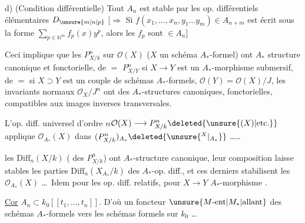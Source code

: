 d) (Condition différentielle) Tout $A_n$ est stable par les op. différentiels élémentaires $D_{\unsure{m|n|p}}$ [$\Longrightarrow$ Si $f(x_1,\ldots,x_n,y_1\ldots y_m)\in A_{n+m}$ est écrit sous la forme $\sum_{p\in\mathbb N^m}f_p(x)y^p$, alors les $f_p$ sont $\in A_n$]


Ceci implique que les  $P^n_{X/k}$ sur $\mathcal O(X)$ ($X$ un  schéma $A_*$-formel) ont  $A_*$ structure canonique et fonctorielle, de $=$ $P^n_{X/Y}$ si $X\to Y$ est un $A_*$-morphisme submersif, de $=$  si $X\supset Y$ est un couple de schémas $A_*$-formels, $\mathcal O(Y)=\mathcal O(X)/J$, les invariants normaux $\mathcal O_X/J^n$ ont des $A_*$-structures canoniques, fonctorielles, compatibles aux images inverses transversales.

L'op. diff. universel d'ordre $n$\quad $\mathcal O(X)\longrightarrow P^n_{X/k}\deleted{\unsure{(X)|\text{etc.}}}$  applique $\mathcal O_{A_*}(X)$ dans $(P^n_{X/k})_{A_*}\deleted{\unsure{^{X}|_{A_*}}}$ \ldots\ldots

 les $\mathrm{Diff}_n(X/k)$ ( des $P^n_{X/k}$) ont  $A_*$-structure canonique, leur composition  laisse stables les parties $\mathrm{Diff}_n(X_{A_*}/k)$ des $A_*$-op. diff., et ces derniers stabilisent les  $\mathcal O_{A_*}(X)$ \ldots\ Idem pour les op. diff. relatifs, pour $X\to Y$ $A_*$-morphisme .

\uline{Cor} $A_n\subset k_0[[t_1,\ldots,t_n]]$.  D'où un foncteur $\unsure{M\text{-ent}|M_*|\text{allant}}$  des schémas $A_*$-formels vers les schémas  formels sur $k_0$ \ldots
